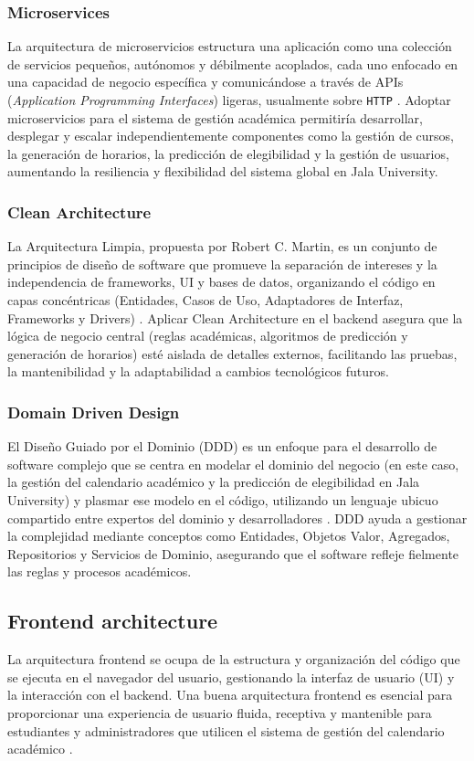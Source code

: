 \subsubsection{Microservices}
La arquitectura de microservicios estructura una aplicación como una colección de servicios pequeños, autónomos y débilmente acoplados, cada uno enfocado en una capacidad de negocio específica y comunicándose a través de APIs (\textit{Application Programming Interfaces}) ligeras, usualmente sobre \texttt{HTTP} \parencite{Newman2015}. Adoptar microservicios para el sistema de gestión académica permitiría desarrollar, desplegar y escalar independientemente componentes como la gestión de cursos, la generación de horarios, la predicción de elegibilidad y la gestión de usuarios, aumentando la resiliencia y flexibilidad del sistema global en Jala University.

\subsubsection{Clean Architecture}
La Arquitectura Limpia, propuesta por Robert C. Martin, es un conjunto de principios de diseño de software que promueve la separación de intereses y la independencia de frameworks, UI y bases de datos, organizando el código en capas concéntricas (Entidades, Casos de Uso, Adaptadores de Interfaz, Frameworks y Drivers) \parencite{Martin2017}. Aplicar Clean Architecture en el backend asegura que la lógica de negocio central (reglas académicas, algoritmos de predicción y generación de horarios) esté aislada de detalles externos, facilitando las pruebas, la mantenibilidad y la adaptabilidad a cambios tecnológicos futuros.

\subsubsection{Domain Driven Design}
El Diseño Guiado por el Dominio (DDD) es un enfoque para el desarrollo de software complejo que se centra en modelar el dominio del negocio (en este caso, la gestión del calendario académico y la predicción de elegibilidad en Jala University) y plasmar ese modelo en el código, utilizando un lenguaje ubicuo compartido entre expertos del dominio y desarrolladores \parencite{Evans2003}. DDD ayuda a gestionar la complejidad mediante conceptos como Entidades, Objetos Valor, Agregados, Repositorios y Servicios de Dominio, asegurando que el software refleje fielmente las reglas y procesos académicos.

\subsection{Frontend architecture}
La arquitectura frontend se ocupa de la estructura y organización del código que se ejecuta en el navegador del usuario, gestionando la interfaz de usuario (UI) y la interacción con el backend. Una buena arquitectura frontend es esencial para proporcionar una experiencia de usuario fluida, receptiva y mantenible para estudiantes y administradores que utilicen el sistema de gestión del calendario académico \parencite{Osmani2017}.

